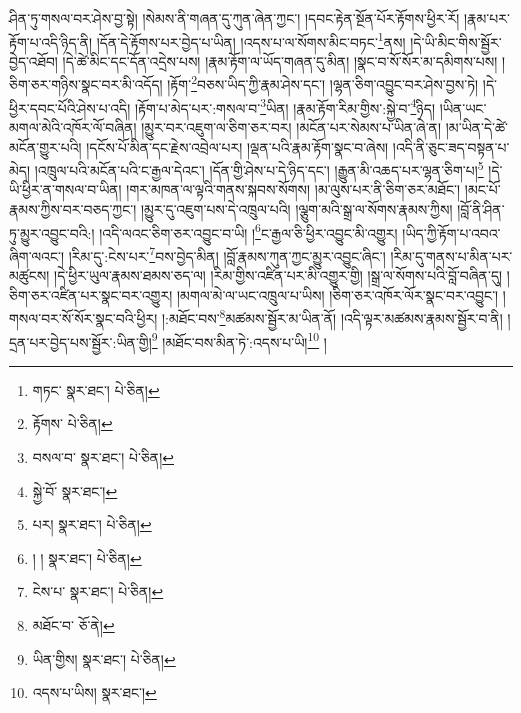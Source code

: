 ཤིན་ཏུ་གསལ་བར་ཤེས་བྱ་སྟེ། །སེམས་ནི་གཞན་དུ་ཀུན་ཞེན་ཀྱང་། །དབང་རྟེན་སྔོན་པོར་རྟོགས་ཕྱིར་རོ། །རྣམ་པར་རྟོག་པ་འདི་ཉིད་ནི། །དོན་དེ་རྟོགས་པར་བྱེད་པ་ཡིན། །འདས་པ་ལ་སོགས་མིང་བཏང་\footnote{གཏང་  སྣར་ཐང་།  པེ་ཅིན། }ནས། །དེ་ཡི་མིང་གིས་སྦྱོར་བྱེད་འཐོབ། །དེ་ཚེ་མིང་དང་དོན་འདྲེས་པས། །རྣམ་རྟོག་ལ་ཡོད་གཞན་དུ་མིན། །སྣང་བ་སོ་སོར་མ་དམིགས་པས། །ཅིག་ཅར་གཉིས་སྣང་བར་མི་འདོད། །རྟོག་\footnote{རྟོགས་  པེ་ཅིན། }བཅས་ཡིད་ཀྱི་རྣམ་ཤེས་དང་། །ལྷན་ཅིག་འབྱུང་བར་ཤེས་བྱས་ཏེ། །དེ་ཕྱིར་དབང་པོའི་ཤེས་པ་འདི། །རྟོག་པ་མེད་པར་:གསལ་བ་\footnote{བསལ་བ་  སྣར་ཐང་།  པེ་ཅིན། }ཡིན། །རྣམ་རྟོག་རིམ་གྱིས་:སྐྱེ་བ་\footnote{སྐྱེ་བོ་  སྣར་ཐང་། }ཉིད། །ཡིན་ཡང་མགལ་མེའི་འཁོར་ལོ་བཞིན། །མྱུར་བར་འཇུག་ལ་ཅིག་ཅར་བར། །མངོན་པར་སེམས་པ་ཡིན་ཞེ་ན། །མ་ཡིན་དེ་ཚེ་མངོན་གྱུར་པའི། །དངོས་པོ་མིན་དང་རྗེས་འབྲེལ་པར། །ལྡན་པའི་རྣམ་རྟོག་སྣང་བ་ཞེས། །འདི་ནི་ཅུང་ཟད་བསྟན་པ་མེད། །འཁྲུལ་པའི་མངོན་པའི་ང་རྒྱལ་དེའང་། །དོན་གྱི་ཤེས་པ་དེ་ཉིད་དང་། །རྒྱུན་མི་འཆད་པར་ལྷན་ཅིག་པ།\footnote{པར།  སྣར་ཐང་།  པེ་ཅིན། } །དེ་ཡི་ཕྱིར་ན་གསལ་བ་ཡིན། །གར་མཁན་ལ་ལྟའི་གནས་སྐབས་སོགས། །མ་ལུས་པར་ནི་ཅིག་ཅར་མཐོང་། །མང་པོ་རྣམས་ཀྱིས་བར་བཅད་ཀྱང་། །མྱུར་དུ་འཇུག་པས་དེ་འཁྲུལ་པའི། །ལྕུག་མའི་སྒྲ་ལ་སོགས་རྣམས་ཀྱིས། །བློ་ནི་ཤིན་ཏུ་མྱུར་འབྱུང་བའི:། །འདི་ལའང་ཅིག་ཅར་འབྱུང་བ་ཡི། །\footnote{། །  སྣར་ཐང་།  པེ་ཅིན། }ང་རྒྱལ་ཅི་ཕྱིར་འབྱུང་མི་འགྱུར། །ཡིད་ཀྱི་རྟོག་པ་འབའ་ཞིག་ལའང་། །རིམ་དུ་:ངེས་པར་\footnote{ངེས་པ་  སྣར་ཐང་།  པེ་ཅིན། }བས་བྱེད་མིན། །བློ་རྣམས་ཀུན་ཀྱང་མྱུར་འབྱུང་ཞིང་། །རིམ་དུ་གནས་པ་མིན་པར་མཚུངས། །དེ་ཕྱིར་ཡུལ་རྣམས་ཐམས་ཅད་ལ། །རིམ་གྱིས་འཛིན་པར་མི་འགྱུར་གྱི། །སྒྲ་ལ་སོགས་པའི་བློ་བཞིན་དུ། །ཅིག་ཅར་འཛིན་པར་སྣང་བར་འགྱུར། །མགལ་མེ་ལ་ཡང་འཁྲུལ་པ་ཡིས། །ཅིག་ཅར་འཁོར་ལོར་སྣང་བར་འབྱུང་། །གསལ་བར་སོ་སོར་སྣང་བའི་ཕྱིར། །:མཐོང་བས་\footnote{མཐོང་བ་  ཅོ་ནེ། }མཚམས་སྦྱོར་མ་ཡིན་ནོ། །འདི་ལྟར་མཚམས་རྣམས་སྦྱོར་བ་ནི། །དྲན་པར་བྱེད་པས་སྦྱོར་:ཡིན་གྱི།\footnote{ཡིན་གྱིས།  སྣར་ཐང་།  པེ་ཅིན། } །མཐོང་བས་མིན་ཏེ་:འདས་པ་ཡི།\footnote{འདས་པ་ཡིས།  སྣར་ཐང་། } །
